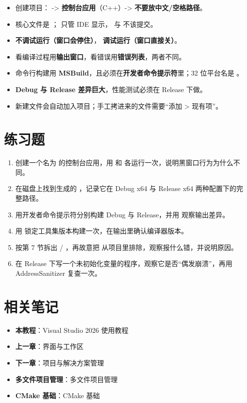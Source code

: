 \begin{itemize}
	\item 创建项目： -> \textbf{控制台应用}（C++）-> \textbf{不要放中文/空格路径}。
	\item 核心文件是 \textbf{}； 只管 IDE 显示， 与  不该提交。
	\item \textbf{ 不调试运行（窗口会停住）}，\textbf{ 调试运行（窗口直接关）}。
	\item 看编译过程用\textbf{输出窗口}，看错误用\textbf{错误列表}，两者不同。
	\item 命令行构建用 \textbf{MSBuild}，且必须在\textbf{开发者命令提示符}里；32 位平台名是 \textbf{}。
	\item \textbf{Debug 与 Release 差异巨大}，性能测试必须在 Release 下做。
	\item 新建文件会自动加入项目；手工拷进来的文件需要“添加 > 现有项”。
\end{itemize}

\section{练习题}

\begin{enumerate}
	\item 创建一个名为  的控制台应用，用  和  各运行一次，说明黑窗口行为为什么不同。
	\item 在磁盘上找到生成的 ，记录它在 Debug x64 与 Release x64 两种配置下的完整路径。
	\item 用开发者命令提示符分别构建 Debug 与 Release，并用  观察输出差异。
	\item 用  锁定工具集版本构建一次，在输出里确认编译器版本。
	\item 按第 7 节拆出  / ，再故意把  从项目里排除，观察报什么错，并说明原因。
	\item 在 Release 下写一个未初始化变量的程序，观察它是否“偶发崩溃”，再用 AddressSanitizer 复查一次。
\end{enumerate}

\section{相关笔记}

\begin{itemize}
	\item \textbf{本教程}：Visual Studio 2026 使用教程
	\item \textbf{上一章}：界面与工作区
	\item \textbf{下一章}：项目与解决方案管理
	\item \textbf{多文件项目管理}：多文件项目管理
	\item \textbf{CMake 基础}：CMake 基础
\end{itemize}
